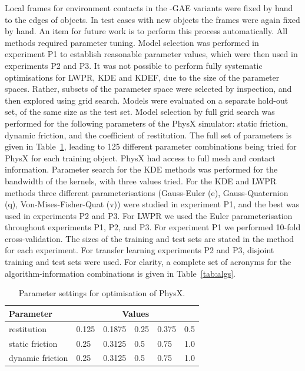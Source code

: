 Local frames for environment contacts in the -GAE variants were fixed
by hand to the edges of objects. In test cases with new objects the
frames were again fixed by hand.  An item for future work is to
perform this process automatically.  All methods required parameter tuning. Model selection was performed in experiment P1 to establish reasonable parameter values, which were then used in experiments P2 and P3.  It was not possible to perform fully systematic optimisations for LWPR, KDE and KDEF, due to the size of the parameter spaces.  Rather, subsets of the parameter space were selected by inspection, and then explored using grid search.  Models were evaluated on a separate hold-out set, of the same size as the test set. Model selection by full grid search was performed for the following parameters of the PhysX simulator: static friction, dynamic friction, and the coefficient of restitution. The full set of parameters is given in Table~\ref{tab:physx}, leading to 125 different parameter combinations being tried for PhysX for each training object. PhysX had access to full mesh and contact information. Parameter search for the KDE methods was performed for the bandwidth of the kernels, with three values tried. For the KDE and LWPR methods three different parameterisations (Gauss-Euler (e), Gauss-Quaternion (q), Von-Mises-Fisher-Quat (v)) were studied in experiment P1, and the best was used in experiments P2 and P3. For LWPR we used the Euler parameterisation throughout experiments P1, P2, and P3. For experiment P1 we performed 10-fold cross-validation. The sizes of the training and test sets are stated in the method for each experiment. For transfer learning experiments P2 and P3, disjoint training and test sets were used. For clarity, a complete set of acronyms for the algorithm-information combinations is given in Table~\ref{tab:algs}. 
\begin{table}[t]
\begin{center}
\begin{tabular}{|l|l|l|l|l|l|}\hline
Parameter & \multicolumn{5}{|c|}{Values} \\ \hline
restitution & 0.125 & 0.1875 & 0.25 &  0.375 & 0.5\\ \hline
static friction & 0.25 & 0.3125 & 0.5 & 0.75 & 1.0  \\ \hline
dynamic friction & 0.25 & 0.3125 & 0.5 & 0.75 & 1.0\\ \hline
\end{tabular}
\caption{Parameter settings for optimisation of PhysX. \label{tab:physx}}
\end{center}
\end{table}

